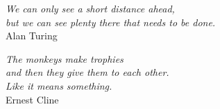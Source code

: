 
\begin{epigrafe}
    \vspace*{\fill}

	\begin{flushright}
		\textit{We can only see a short distance ahead, \\
		but we can see plenty there that needs to be done.} \\
		Alan Turing
	\end{flushright}
	
	\vspace{\onelineskip}
	
	\begin{flushright}
		\textit{The monkeys make trophies \\
		and then they give them to each other. \\
		Like it means something.} \\
		Ernest Cline
	\end{flushright}
	
%
%	
%	
%
%	
%	
\end{epigrafe}

